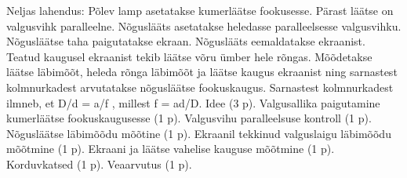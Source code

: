 Neljas lahendus: Põlev lamp asetatakse kumerläätse fookusesse. Pärast läätse on valgusvihk paralleelne. Nõguslääts asetatakse heledasse paralleelsesse valgusvihku. Nõgusläätse taha paigutatakse ekraan. Nõguslääts eemaldatakse ekraanist. Teatud kaugusel ekraanist tekib läätse võru ümber hele rõngas. Mõõdetakse läätse läbimõõt, heleda rõnga läbimõõt ja läätse kaugus ekraanist ning sarnastest kolmnurkadest arvutatakse nõgusläätse fookuskaugus. Sarnastest kolmnurkadest ilmneb, et D/d = a/f , millest f = ad/D. Idee (3 p). Valgusallika paigutamine kumerläätse fookuskaugusesse (1 p). Valgusvihu paralleelsuse kontroll (1 p). Nõgusläätse läbimõõdu mõõtine (1 p). Ekraanil tekkinud valguslaigu läbimõõdu mõõtmine (1 p). Ekraani ja läätse vahelise kauguse mõõtmine (1 p). Korduvkatsed (1 p). Veaarvutus (1 p).
\probend
